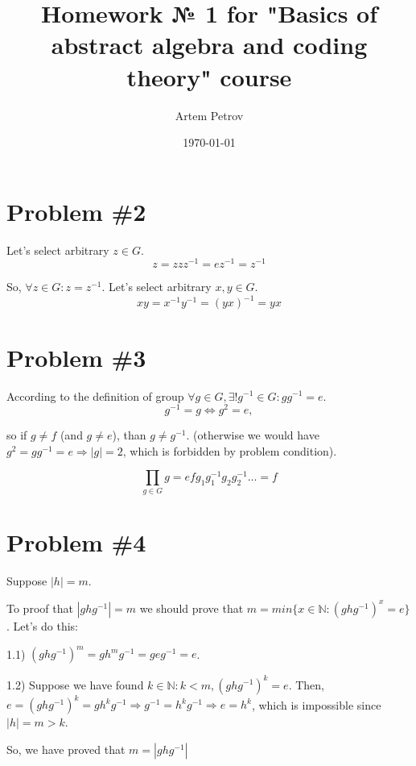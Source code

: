 \documentclass[a4paper,12pt]{article}
\author{Artem Petrov}
\title{Homework № 1 for "Basics of abstract algebra and coding theory" course}
\date{{\selectlanguage{english}\today} }
\begin{document}

\maketitle

\section*{Problem \#2}

\vartriangle

Let's select arbitrary $ z \in G$.
\[ z = z z z^{-1} = e z^{-1} = z^{-1}\]

So, $ \forall z \in G: z = z^{-1} $.
Let's select arbitrary $ x, y \in G$.
\[ xy = x^{-1}y^{-1} = (yx)^{-1} = yx \]

\hfill \square

\section*{Problem \#3}

\triangle

According to the definition of group $ \forall g \in G,  \exists! g^{-1} \in G : gg^{-1} = e $.
\[ g^{-1} = g \Leftrightarrow  g^{2} = e, \]

so if $ g\ne f $ (and $ g \ne e $), than $ g \ne g^{-1} $. (otherwise we would have $ g^{2} = gg^{-1} = e \Rightarrow |g| = 2$, which is forbidden by problem condition).

\[ \prod_{g \in G} g = e f g_{1}g_{1}^{-1}g_{2}g_{2}^{-1}... = f\]
\hfill \square

\section*{Problem \#4}

\triangle

Suppose $ |h| = m $.

To proof that $ |ghg^{-1}| = m $ we should prove that $ m = min \{x \in \mathbb{N}: (ghg^{-1})^{x} = e \}$. Let's do this:

1.1) $ (ghg^{-1})^{m} = gh^{m}g^{-1} = geg^{-1} = e$.

1.2) Suppose we have found $ k\in \mathbb{N}: k < m , (ghg^{-1})^{k} = e$. Then, $ e = (ghg^{-1})^{k} = gh^{k}g^{-1} \Rightarrow g^{-1} = h^{k}g^{-1} \Rightarrow e = h^{k} $, which is impossible since $ |h| = m > k $.

So, we have proved that $ m = |ghg^{-1}|$
\end{document}
